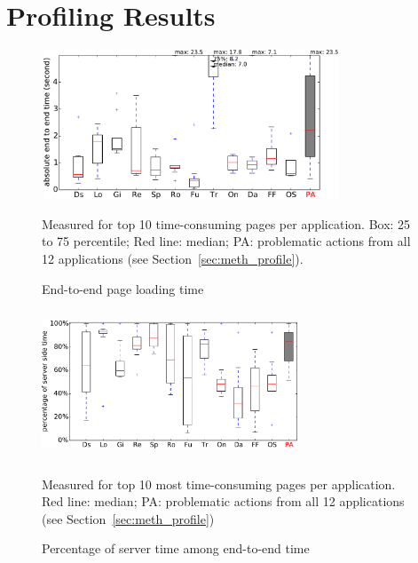 \section{Profiling Results}
\label{sec:profiling}

\begin{figure}
\centering
\includegraphics[height=1.75in, width=3.5in]{hownotto/EndToEnd}
\caption{End-to-end page loading time
}
\label{fig:eoeFig}
{\footnotesize Measured for top 10 time-consuming pages per application. Box: 25 to 75 percentile; Red line: median; PA: problematic actions from all 12 applications (see Section~\ref{sec:meth_profile}).\par}
\end{figure}


\begin{figure}
\centering
\includegraphics[height=1.75in, width=3in]{hownotto/Percentage}
\caption{Percentage of server time among end-to-end time}
{\footnotesize Measured for top 10 most time-consuming pages per application.
Red line: median; PA: problematic actions from all 12 applications (see Section~\ref{sec:meth_profile})}
\vspace{-0.2in}
\label{percentageFig}
\end{figure}

